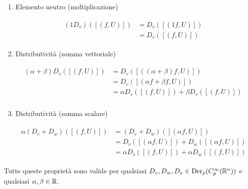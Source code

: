{\begin{enumerate}
	\item Elemento neutro (moltiplicazione)
	
	\begin{align}
		\begin{split}
			(1 D_{v}) ([(f,U)]) &= D_{v} ([(1 f,U)]) \\
			&= D_{v} ([(f,U)])
		\end{split}
	\end{align}
	
	\item Distributività (somma vettoriale)
	
	\begin{align}
		\begin{split}
			(\alpha + \beta) D_{v} ([(f,U)]) &= D_{v} ([((\alpha + \beta) f,U)]) \\
			&= D_{v} ([(\alpha f + \beta f,U)]) \\
			&= \alpha D_{v} ([(f,U)]) + \beta D_{v} ([(f,U)]) \\
		\end{split}
	\end{align}
	
	\item Distributività (somma scalare)
	
	\begin{align}
		\begin{split}
			\alpha (D_{v} + D_{w}) ([(f,U)]) &= (D_{v} + D_{w}) ([(\alpha f,U)]) \\
			&= D_{v} ([(\alpha f,U)]) + D_{w} ([(\alpha f,U)]) \\
			&= \alpha D_{v} ([(f,U)]) + \alpha D_{w} ([(f,U)])
		\end{split}
	\end{align}
\end{enumerate}

Tutte queste proprietà sono valide per qualsiasi $ D_{v}, D_{w}, D_{x} \in \operatorname{Der}_{p}(C_{p}^{\infty}(\mathbb{R}^{n})) $ e qualsiasi $ \alpha, \beta \in \mathbb{R} $.
}


